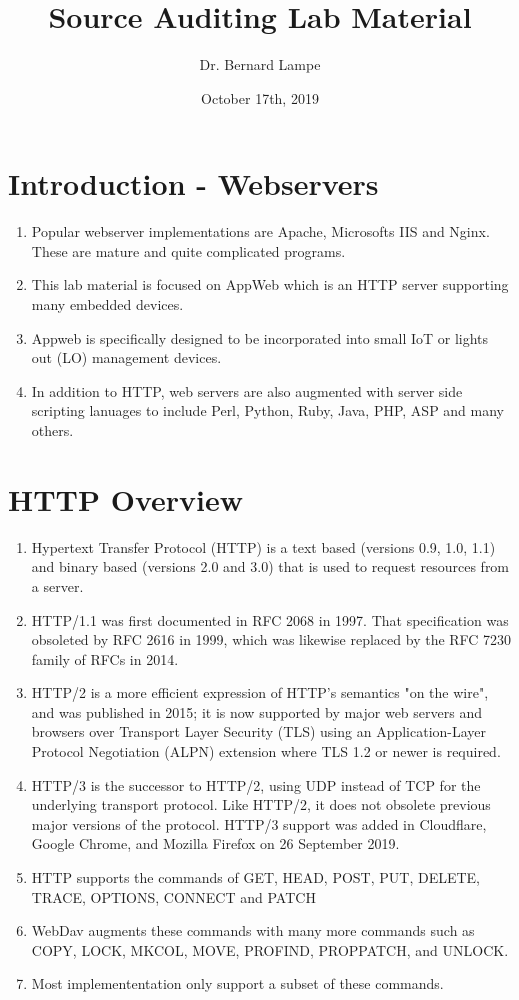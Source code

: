 \documentclass[12pt]{Training}
\title{Source Auditing Lab Material}
\author{Dr. Bernard Lampe}
\date{October 17th, 2019}
\begin{document}
\maketitle

\section*{Introduction - Webservers}
\begin{enumerate}
    \item Popular webserver implementations are Apache, Microsofts IIS and Nginx. These are mature and quite complicated programs.
    \item This lab material is focused on AppWeb which is an HTTP server supporting many embedded devices.
    \item Appweb is specifically designed to be incorporated into small IoT or lights out (LO) management devices.
    \item In addition to HTTP, web servers are also augmented with server side scripting lanuages to include Perl, Python, Ruby, Java, PHP, ASP and many others.
\end{enumerate}

\section*{HTTP Overview}
\begin{enumerate}
    \item Hypertext Transfer Protocol (HTTP) is a text based (versions 0.9, 1.0, 1.1) and binary based (versions 2.0 and 3.0) that is used to request resources from a server.
    \item HTTP/1.1 was first documented in RFC 2068 in 1997. That specification was obsoleted by RFC 2616 in 1999, which was likewise replaced by the RFC 7230 family of RFCs in 2014.
    \item HTTP/2 is a more efficient expression of HTTP's semantics "on the wire", and was published in 2015; it is now supported by major web servers and browsers over Transport Layer Security (TLS) using an Application-Layer Protocol Negotiation (ALPN) extension where TLS 1.2 or newer is required.
    \item HTTP/3 is the successor to HTTP/2, using UDP instead of TCP for the underlying transport protocol. Like HTTP/2, it does not obsolete previous major versions of the protocol. HTTP/3 support was added in Cloudflare, Google Chrome, and Mozilla Firefox on 26 September 2019.
    \item HTTP supports the commands of GET, HEAD, POST, PUT, DELETE, TRACE, OPTIONS, CONNECT and PATCH
    \item WebDav augments these commands with many more commands such as COPY, LOCK, MKCOL, MOVE, PROFIND, PROPPATCH, and UNLOCK.
    \item Most implemententation only support a subset of these commands.
\end{enumerate}
\end{document}
